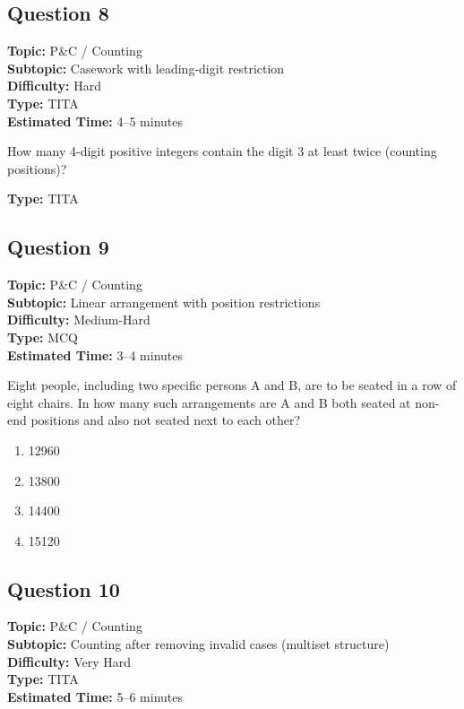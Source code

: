\documentclass[11pt]{article}
\begin{document}
\subsection*{Question 8}
\textbf{Topic:} P\&C / Counting \\
\textbf{Subtopic:} Casework with leading-digit restriction \\
\textbf{Difficulty:} Hard \\
\textbf{Type:} TITA \\
\textbf{Estimated Time:} 4--5 minutes

\begin{tcolorbox}
How many 4-digit positive integers contain the digit 3 at least twice (counting positions)?
\end{tcolorbox}

\textbf{Type:} TITA

\subsection*{Question 9}
\textbf{Topic:} P\&C / Counting \\
\textbf{Subtopic:} Linear arrangement with position restrictions \\
\textbf{Difficulty:} Medium-Hard \\
\textbf{Type:} MCQ \\
\textbf{Estimated Time:} 3--4 minutes

\begin{tcolorbox}
Eight people, including two specific persons A and B, are to be seated in a row of eight chairs. In how many such arrangements are A and B both seated at non-end positions and also not seated next to each other?
\end{tcolorbox}

\begin{enumerate}[label=(\Alph*)]
\item 12960
\item 13800
\item 14400
\item 15120
\end{enumerate}

\subsection*{Question 10}
\textbf{Topic:} P\&C / Counting \\
\textbf{Subtopic:} Counting after removing invalid cases (multiset structure) \\
\textbf{Difficulty:} Very Hard \\
\textbf{Type:} TITA \\
\textbf{Estimated Time:} 5--6 minutes
\end{document}
